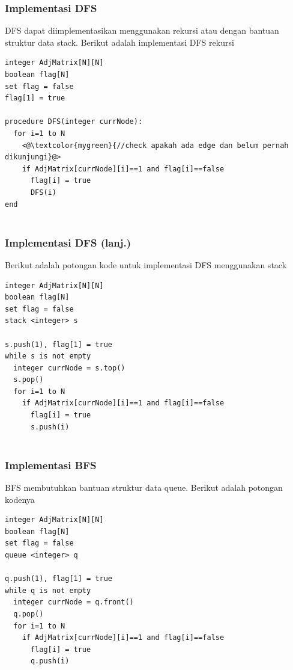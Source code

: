 \begin{frame}[fragile]
\frametitle{Implementasi DFS}
DFS dapat diimplementasikan menggunakan rekursi atau dengan bantuan struktur data stack. Berikut adalah implementasi DFS rekursi\newline
\begin{lstlisting}
integer AdjMatrix[N][N]
boolean flag[N]
set flag = false
flag[1] = true

procedure DFS(integer currNode):
  for i=1 to N
    <@\textcolor{mygreen}{//check apakah ada edge dan belum pernah dikunjungi}@>
    if AdjMatrix[currNode][i]==1 and flag[i]==false
      flag[i] = true
      DFS(i)
end
				
\end{lstlisting}
\end{frame}

\begin{frame}[fragile]
\frametitle{Implementasi DFS (lanj.)}
Berikut adalah potongan kode untuk implementasi DFS menggunakan stack\newline
\begin{lstlisting}
integer AdjMatrix[N][N]
boolean flag[N]
set flag = false
stack <integer> s

s.push(1), flag[1] = true
while s is not empty
  integer currNode = s.top()
  s.pop()
  for i=1 to N
    if AdjMatrix[currNode][i]==1 and flag[i]==false
      flag[i] = true
      s.push(i)
				
\end{lstlisting}
\end{frame}

\begin{frame}[fragile]
\frametitle{Implementasi BFS}
BFS membutuhkan bantuan struktur data queue. Berikut adalah potongan kodenya\newline
\begin{lstlisting}
integer AdjMatrix[N][N]
boolean flag[N]
set flag = false
queue <integer> q

q.push(1), flag[1] = true
while q is not empty
  integer currNode = q.front()
  q.pop()
  for i=1 to N
    if AdjMatrix[currNode][i]==1 and flag[i]==false
      flag[i] = true
      q.push(i)
				
\end{lstlisting}
\end{frame}

